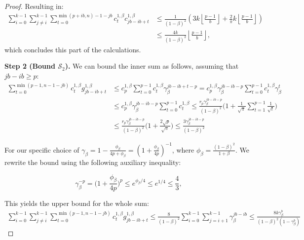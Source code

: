\documentclass{article} %
\begin{document}
\begin{proof}
Resulting in:
%
\begin{equation}
\begin{aligned}
    \sum\limits_{i = 0}^{k - 1}\sum\limits_{j \ne i}^{k - 1} \sum\limits_{t = 0}^{\min(p + ib, n) - 1- jb} c^{1, \beta}_t c^{1, \beta}_{jb -ib + t} &\le \frac{1}{(1 - \beta)^2}\left(3k\left\lfloor\frac{p - 1}{b}\right\rfloor + \frac{2}{\pi} k \left\lfloor\frac{p - 1}{b}\right\rfloor\right) \\
    &\le \frac{4k}{(1 - \beta)^2}\left\lfloor\frac{p - 1}{b}\right\rfloor,
\end{aligned}
\end{equation}
which concludes this part of the calculations.

\textbf{Step 2 (Bound $\mathcal{S}_2$).} We can bound the inner sum as follows, assuming that $jb - ib \ge p$:
\begin{equation}
\begin{aligned}
\sum\limits_{t = 0}^{\min(p - 1, n - 1 - jb)} c^{1, \beta}_{t} g^{1, \beta}_{jb - ib + t}  &\le c^{1, \beta}_p\sum\limits_{t = 0}^{p - 1} c^{1, \beta}_{t} \gamma_{\beta}^{jb - ib + t - p} =  c^{1, \beta}_p \gamma_{\beta}^{jb - ib - p}\sum\limits_{t = 0}^{p - 1} c^{1,\beta}_{t} \gamma_{\beta}^t\\
&\le c^{1, \beta}_p \gamma_{\beta}^{jb - ib - p}\sum\limits_{t = 0}^{p - 1} c^{1,\beta}_{t} \le  \frac{r_p\gamma_{\beta}^{jb -ib - p}}{(1 - \beta)^2}  \bigg(1 + \frac{1}{\sqrt{\pi}} \sum\limits_{t = 1}^{p - 1}\frac{1}{\sqrt{t}}\bigg)  \\
&\le  \frac{r_p\gamma_{\beta}^{jb -ib - p}}{(1 - \beta)^2}  \bigg(1 + \frac{2\sqrt{p}}{\sqrt{\pi}}\bigg) \le \frac{3 \gamma_{\beta}^{jb - ib - p}}{(1 - \beta)^2}
\end{aligned}
\end{equation}

For our specific choice of $\gamma_{\beta} = 1 - \frac{\phi_{\beta}}{4p + \phi_{\beta}}= \left(1 + \frac{\phi_{\beta}}{4p}\right)^{-1}$, where $\phi_{\beta} = \frac{(1 - \beta)^2}{1 + \beta}$. We rewrite the bound using the following auxiliary inequality:

\begin{equation}
    \gamma_{\beta}^{-p} = \bigg(1 + \frac{\phi_{\beta}}{4p}\bigg)^p \le e^{\phi_{\beta}/4} \le e^{1/4}\le \frac{4}{3}, 
\end{equation}

This yields the upper bound for the whole sum:
\begin{equation}
\begin{aligned}
\sum\limits_{i = 0}^{k - 1}\sum\limits_{j \ne i}^{k - 1}\sum\limits_{t = 0}^{\min(p - 1, n - 1 - jb)} c^{1,\beta}_{t} g^{1,\beta}_{jb - ib + t} \le \frac{8}{(1 - \beta)^2} \sum\limits_{i = 0}^{k - 1}\sum\limits_{j = i + 1}^{k - 1}\gamma_{\beta}^{jb - ib} \le \frac{8k\gamma_{\beta}^b}{(1 - \beta)^2(1 - \gamma_{\beta}^b)}
\end{aligned}
\end{equation}


\end{proof}
\end{document}

